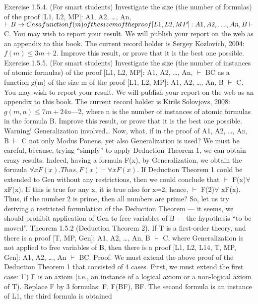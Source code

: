 Exercise 1.5.4. (For smart students) Investigate the size (the number of formulas) of the proof [L1, L2,
MP]: A1, A2, \ldots , An, \(\vdash B\rightarrow C as a function f(m) of the size m of the proof [L1, L2, MP]: A1, A2, \ldots , An, B \vdash\)
C. You may wish to report your result. We will publish your report on the web as an appendix to this
book. The current record holder is Sergey Kozlovich, 2004: \(f(m) \leq 3m+2\). Improve this result, or prove
that it is the best one possible.
Exercise 1.5.5. (For smart students) Investigate the size (the number of instances of atomic formulas) of
the proof [L1, L2, MP]: A1, A2, \ldots , An, \(\vdash\) B\IMPLIES C as a function g(m) of the size m of the proof [L1, L2, MP]:
A1, A2, \ldots , An, B \(\vdash\) C. You may wish to report your result. We will publish your report on the web as an
appendix to this book. The current record holder is Kirils Solovjovs, 2008: \(g(m, n) \leq 7m+24n\)---2, where n
is the number of instances of atomic formulas in the formula B. Improve this result, or prove that it is the
best one possible.
Warning! Generalization involved\ldots 
Now, what, if in the proof of A1, A2, \ldots , An, B \(\vdash\) C not only Modus Ponens, yet also Generalization is
used?
We must be careful, because, trying ``simply'' to apply Deduction Theorem 1, we can obtain crazy results.
Indeed, having a formula F(x), by Generalization, we obtain the formula \(\forall xF(x). Thus, F(x) \vdash \forall xF(x)\). If
Deduction Theorem 1 could be extended to Gen without any restrictions, then we could conclude that \(\vdash\)
F(x)\IMPLIES \(\forall\) xF(x). If this is true for any x, it is true also for x=2, hence, \(\vdash\) F(2)\IMPLIES \(\forall\) xF(x). Thus, if the number
2 is prime, then all numbers are prime?
So, let us try deriving a restricted formulation of the Deduction Theorem --- it seems, we should prohibit
application of Gen to free variables of B --- the hypothesis ``to be moved''.
Theorem 1.5.2 (Deduction Theorem 2). If T is a first-order theory, and there is a proof [T, MP, Gen]: A1,
A2, \ldots , An, B \(\vdash\) C, where Generalization is not applied to free variables of B, then there is a proof [L1, L2,
L14, T, MP, Gen]: A1, A2, \ldots , An \(\vdash\) B\IMPLIES C.
Proof. We must extend the above proof of the Deduction Theorem 1 that consisted of 4 cases. First, we
must extend the first case:
1') F is an axiom (i.e., an instance of a logical axiom or a non-logical axiom of T). Replace F by 3
formulas: F, F\IMPLIES (B\IMPLIES F), B\IMPLIES F. The second formula is an instance of L1, the third formula is obtained
